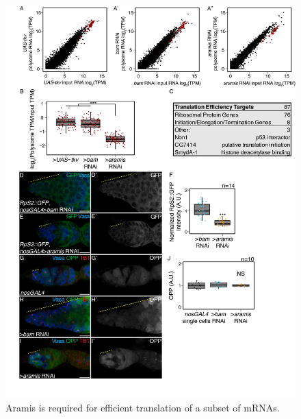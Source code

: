 \documentclass[12pt,oneside]{reedthesis}
\begin{document}
\begin{figure}

{\centering \includegraphics[width=6.5 in,height=8.9375 in]{./figure/Ribosome Biogenesis/Ribosome Biogenesis 4} 

}

\caption[Aramis is required for efficient translation of a subset of mRNAs.]{Aramis is required for efficient translation of a subset of mRNAs.}\label{fig:unnamed-chunk-12}
\end{figure}
\textbf{\hfill\break
}
\end{document}

